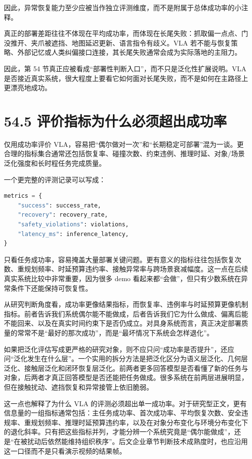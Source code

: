 因此，异常恢复能力至少应被当作独立评测维度，而不是附属于总体成功率的小注释。

真正的部署差距往往不体现在平均成功率，而体现在长尾失败：抓取偏一点点、门没推开、夹爪被遮挡、地图延迟更新、语言指令有歧义。VLA 若不能与恢复策略、外部记忆或人类纠偏接口连接，其长尾失败通常会成为实际落地的主阻力。

因此，第 54 节真正应被看成“部署性判断入口”，而不只是泛化性扩展说明。VLA 是否接近真实系统，很大程度上要看它如何面对长尾失败，而不是如何在主路径上更漂亮地成功。

\section*{54.5 评价指标为什么必须超出成功率}


仅用成功率评价 VLA，容易把“偶尔做对一次”和“长期稳定可部署”混为一谈。更合理的指标集合通常还包括恢复率、碰撞次数、约束违例、推理时延、对象/场景泛化强度和长时程任务完成质量。

一个更完整的评测记录可以写成：

\begin{lstlisting}[language=python]
metrics = {
    "success": success_rate,
    "recovery": recovery_rate,
    "safety_violations": violations,
    "latency_ms": inference_latency,
}
\end{lstlisting}

只看任务成功率，容易掩盖大量部署关键问题。更有意义的指标往往包括恢复次数、重规划频率、时延预算违约率、接触异常率与跨场景衰减幅度。这一点在后续真实系统比较中非常重要，因为很多 demo 看起来都“会做”，但只有少数系统在异常条件下还能保持可恢复性。

从研究判断角度看，成功率更像结果指标，而恢复率、违例率与时延预算更像机制指标。前者告诉我们系统偶尔能不能做成，后者告诉我们它为什么做成、偏离后能不能回来、以及在真实时间约束下是否仍成立。对具身系统而言，真正决定部署质量的常常不是“最好的那次成功”，而是“最坏情况下系统会怎样退化”。

如果把泛化评估写成更严格的研究对象，则不应只问“成功率是否提升”，还应问“泛化发生在什么层”。一个实用的拆分方法是把泛化区分为语义层泛化、几何层泛化、接触层泛化和闭环恢复层泛化。前两者更多回答模型是否看懂了新的任务与对象，后两者才真正回答模型是否还能把任务做成。很多系统在前两层进展明显，但在接触扰动、遮挡恢复和异常接管上依旧脆弱。

这一点也解释了为什么 VLA 的评测必须超出单一成功率。对于研究型正文，更有信息量的一组指标通常包括：主任务成功率、首次成功率、平均恢复次数、安全违规率、重规划频率、推理时延预算违约率，以及在对象分布变化与环境分布变化下的退化斜率。只有把这些指标并列，才能分辨一个系统究竟是“偶尔能做成”，还是“在被扰动后依然能维持组织秩序”。后文企业章节判断技术成熟度时，也应沿用这一口径而不是只看演示视频的结果帧。

